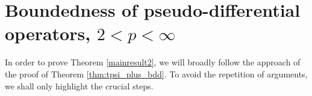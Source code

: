 \documentclass[12pt,reqno]{amsart}
\newcommand{\Z}{\mathbb Z}%
\theoremstyle{definition}
\theoremstyle{definition}
\newtheorem{remark}[theorem]{Remark}
\numberwithin{equation}{section}
\begin{document}

\section{Boundedness of pseudo-differential operators, \texorpdfstring{$2<p<\infty$}{2pinfinity}}\label{bddness_of_T_Psi_p>2}
In order to prove Theorem \ref{mainresult2}, we will broadly follow the approach of the proof of Theorem \ref{thm:tpsi_plus_bdd}. To avoid the repetition of arguments, we shall only highlight the crucial steps.
\end{document}
